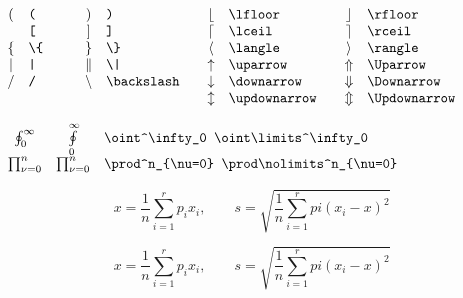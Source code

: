 \documentclass{article}
\begin{document}
    \begin{math}
        \begin{array}{cl@{\qquad\quad}cl@{\qquad}cl@{\qquad}cl}
            ( & \verb=(= & ) & \verb=)= & \lfloor & \verb=\lfloor= & \rfloor & \verb=\rfloor= \\
               & \verb=[= & ]  & \verb=]= & \lceil & \verb=\lceil= & \rceil & \verb=\rceil= \\
            \{ & \verb=\{= & \} & \verb=\}= & \langle & \verb=\langle= & \rangle & \verb=\rangle= \\
            | & \verb=|= & \| & \verb=\|= & \uparrow & \verb=\uparrow= & \Uparrow & \verb=\Uparrow= \\
            / & \verb=/= & \backslash & \verb=\backslash= & \downarrow & \verb=\downarrow= & \Downarrow & \verb=\Downarrow= \\
              &          &   &                    & \updownarrow & \verb=\updownarrow= & \Updownarrow & \verb=\Updownarrow= \\
        \end{array}
    \end{math}


    \begin{math}
        \begin{array}{ccl}
            \oint^\infty_0 & \oint\limits^\infty_0 & \verb=\oint^\infty_0 \oint\limits^\infty_0= \\
            \prod^n_{\nu=0} & \prod\nolimits^n_{\nu=0} & \verb|\prod^n_{\nu=0} \prod\nolimits^n_{\nu=0}| \\
        \end{array}
    \end{math}


    \begin{equation}
        x=\frac{1}{n}\sum_{i=1}^rp_ix_i,\qquad s=\sqrt{\frac{1}{n}\sum_{i=1}^rpi(x_i-x)^2}
    \end{equation}

    \begin{displaymath}
        x=\frac{1}{n}\sum_{i=1}^rp_ix_i,\qquad s=\sqrt{\frac{1}{n}\sum_{i=1}^rpi(x_i-x)^2}
    \end{displaymath}
\end{document}
